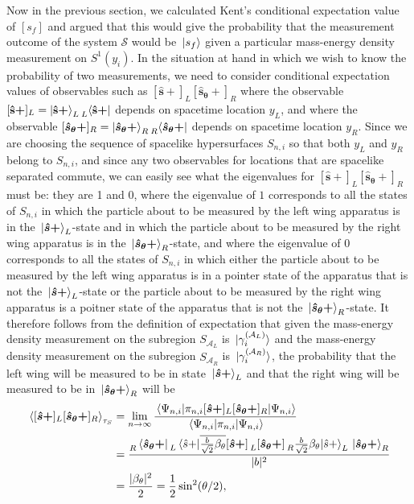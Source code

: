 Now in the previous section, we calculated Kent's conditional expectation value of $[s_f]$ and argued that this would give the probability that the measurement outcome of the system $\mathcal{S}$ would be $\ket*{s_f}$ given a particular mass-energy density measurement on $S^1(y_i)$. In the situation at hand in which we wish to know the probability of two measurements, we need to consider conditional expectation values of observables such as  $[\bm{\hat{s}+}]_L[\bm{\hat{s}_\theta+}]_R$ where the observable $[\vb{\hat{{s}}}\bm{+}]_L=\ket{\vb{\hat{{s}}}\bm{+}}_L\prescript{}{L}{\bra{\vb{\hat{{s}}}\bm{+}}}$ depends on spacetime location $y_L$, and where the observable $[\bm{\hat{s}_\theta+}]_R=\ket{\bm{\hat{s}_\theta+}}_R\prescript{}{R}{\bra{\bm{\hat{s}_\theta+}}}$ depends on spacetime location $y_R.$ Since we are choosing the sequence of spacelike hypersurfaces $S_{n,i}$ so that both $y_L$ and $y_R$ belong to $S_{n,i}$, and since any two observables for locations that are spacelike separated commute, we can easily see what the eigenvalues for  $[\bm{\hat{s}+}]_L[\bm{\hat{s}_\theta+}]_R$ must be: they are 1 and 0, where the eigenvalue of $1$ corresponds to all the states of $S_{n,i}$ in which the particle about to be measured by the left wing apparatus is in the $\ket*{\bm{\hat{s}+}}_L$-state and in which the particle about to be measured by the right wing apparatus is in the $\ket*{\bm{\hat{s}_\theta+}}_R$-state, and where the eigenvalue of $0$ corresponds to all the states of $S_{n,i}$ in which either the particle about to be measured by the left wing apparatus is in a pointer state of the apparatus that is not the $\ket*{\bm{\hat{s}+}}_L$-state or the particle about to be measured by the right wing apparatus is a poitner state of the apparatus that is not the $\ket*{\bm{\hat{s}_\theta+}}_R$-state. It therefore follows from the definition of expectation that given the mass-energy density measurement on the subregion $S_{\mathcal{A}_L}$ is $\ket*{\gamma_i^{(\mathcal{A}_L)}}$ and the mass-energy density measurement on the subregion $S_{\mathcal{A}_R}$ is $\ket*{\gamma_i^{(\mathcal{A}_R)}}$, the probability that the left wing will be measured to be in state  $\ket*{\bm{\hat{s}+}}_L$ and that the right wing will be measured to be in $\ket*{\bm{\hat{s}_\theta+}}_R$ will be
\begin{equation}\label{slsrev}
	\begin{split}
	\ev*{[\bm{\hat{s}+}]_L[\bm{\hat{s}_\theta+}]_R}_{\tau_S}
	&=\lim_{n\rightarrow\infty}\frac{\ev*{\pi_{n,i}[\bm{\hat{s}+}]_L[\bm{\hat{s}_\theta+}]_R}{\Psi_{n,i}}}{\ev*{\pi_{n,i}}{\Psi_{n,i}}}\\
	&=\frac{\prescript{}{R}{\bra*{\bm{\hat{s}_\theta+}}}\prescript{}{L}{}\ev*{\overline{\frac{b}{\sqrt{2}}\beta_{\theta}}[\bm{\hat{s}+}]\prescript{}{L}{}[\bm{\hat{s}_\theta+}]\prescript{}{R}{}\frac{b}{\sqrt{2}}\beta_{\theta}}{\hat{s}+}_L\ket*{\bm{\hat{s}_\theta+}}_R}{|b|^2}\\
	&=\frac{|\beta_\theta|^2}{2}=\frac{1}{2}\sin^2(\theta/2),
	\end{split}	
\end{equation}

